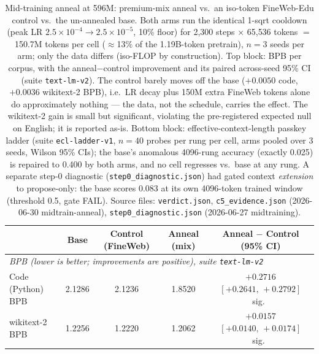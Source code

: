 \begin{table}[t]
\centering
\caption{Mid-training anneal at 596M: premium-mix anneal vs.\ an iso-token FineWeb-Edu control vs.\ the un-annealed base.
Both arms run the identical 1-sqrt cooldown (peak LR $2.5\times10^{-4} \rightarrow 2.5\times10^{-5}$, 10\% floor) for 2{,}300 steps $\times$ 65{,}536 tokens $=$ 150.7M tokens per cell ($\approx$13\% of the 1.19B-token pretrain), $n{=}3$ seeds per arm; only the data differs (iso-FLOP by construction).
Top block: BPB per corpus, with the anneal$-$control improvement and its paired across-seed 95\% CI (suite \texttt{text-lm-v2}).
The control barely moves off the base ($+0.0050$ code, $+0.0036$ wikitext-2 BPB), i.e.\ LR decay plus 150M extra FineWeb tokens alone do approximately nothing --- the data, not the schedule, carries the effect.
The wikitext-2 gain is small but significant, violating the pre-registered expected null on English; it is reported as-is.
Bottom block: effective-context-length passkey ladder (suite \texttt{ecl-ladder-v1}, $n{=}40$ probes per rung per cell, arms pooled over 3 seeds, Wilson 95\% CIs); the base's anomalous 4096-rung accuracy (exactly 0.025) is repaired to 0.400 by both arms, and no cell regresses vs.\ base at any rung.
A separate step-0 diagnostic (\texttt{step0\_diagnostic.json}) had gated context \emph{extension} to propose-only: the base scores 0.083 at its own 4096-token trained window (threshold 0.5, gate FAIL).
Source files: \texttt{verdict.json}, \texttt{c5\_evidence.json} (2026-06-30 midtrain-anneal), \texttt{step0\_diagnostic.json} (2026-06-27 midtraining).}
\label{tab:midtrain}
\footnotesize
\setlength{\tabcolsep}{3.5pt}
\begin{tabular}{lcccc}
\toprule
 & Base & Control (FineWeb) & Anneal (mix) & Anneal $-$ Control (95\% CI) \\
\midrule
\multicolumn{5}{l}{\emph{BPB (lower is better; improvements are positive), suite \texttt{text-lm-v2}}} \\
Code (Python) BPB        & 2.1286 & 2.1236 & 1.8520 & $+0.2716$ $[+0.2641,\,+0.2792]$ sig.\ \\
wikitext-2 BPB           & 1.2256 & 1.2220 & 1.2062 & $+0.0157$ $[+0.0140,\,+0.0174]$ sig.\ \\

\end{tabular}
\end{table}
